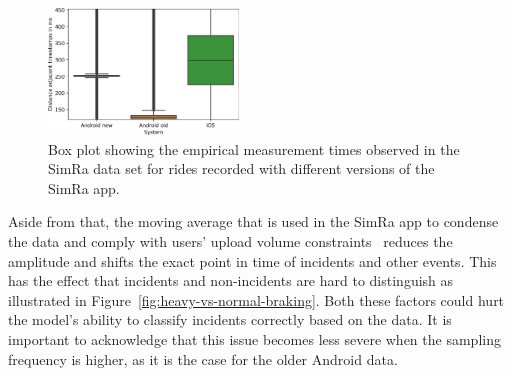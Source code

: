 \begin{figure}[t]
	\centering
	\includegraphics[width=0.45\textwidth]{fig/empirical_measurements.png}
	\caption{Box plot showing the empirical measurement times observed in the SimRa data set for rides recorded with different versions of the SimRa app.}
	\label{fig:emp-measurements}
\end{figure}

Aside from that, the moving average that is used in the SimRa app to condense the data and comply with users' upload volume constraints~\cite{karakaya2020simra} reduces the amplitude and shifts the exact point in time of incidents and other events.
This has the effect that incidents and non-incidents are hard to distinguish as illustrated in Figure~\ref{fig:heavy-vs-normal-braking}.
Both these factors could hurt the model's ability to classify incidents correctly based on the data.
It is important to acknowledge that this issue becomes less severe when the sampling frequency is higher, as it is the case for the older Android data.

